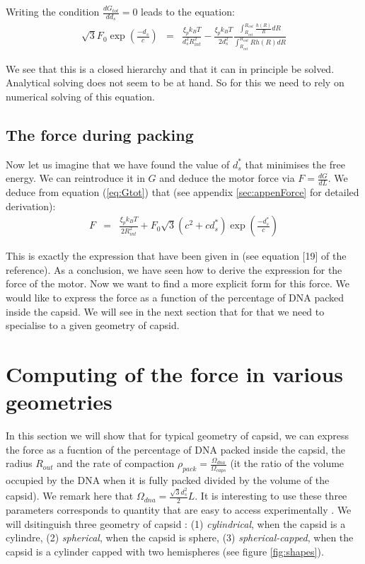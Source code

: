 \documentclass{article}
\begin{document}
Writing the condition $ \frac{d G_{tot}}{d d_s} = 0 $ leads to the equation:
\begin{eqnarray}
    \sqrt{3} F_0 \exp{ \left( \frac{-d_s}{c} \right) } &=& \frac{\xi_p k_B T}{d_s^2 R_{int}^2} - \frac{\xi_p k_B T}{2 d_s^2} \frac{\int_{R_{int}}^{R_{out}} \frac{h(R)}{R} dR}{\int_{R_{int}}^{R_{out}} R h(R) dR} 
    \label{eq:deriv_ds_final}
\end{eqnarray}

We see that this is a closed hierarchy and that it can in principle be solved. Analytical solving does not seem to be at hand. So for this we need to rely on numerical solving of this equation.

\subsection{The force during packing}
Now let us imagine that we have found the value of $d^*_s$ that minimises the free energy. We can reintroduce it in $G$ and deduce the motor force via $F=\frac{d G}{d L}$. We deduce from equation (\ref{eq:Gtot}) that (see appendix \ref{sec:appenForce} for detailed derivation):
\begin{eqnarray}
    F &=& \frac{\xi_p k_B T}{2 R_{int}^2} + F_0 \sqrt{3} \left( c^2 + c d_s^* \right) \exp{ \left( \frac{-d^*_s}{c} \right) }
    \label{eq:F}
\end{eqnarray}

This is exactly the expression that have been given in \cite{purohit2003} (see equation [19] of the reference).
As a conclusion, we have seen how to derive the expression for the force of the motor. Now we want to find a more explicit form for this force. We would like to express the force as a function of the percentage of DNA packed inside the capsid. We will see in the next section that for that we need to specialise to a given geometry of capsid.

\section{Computing of the force in various geometries}

In this section we will show that for typical geometry of capsid, we can express the force as a fucntion of the percentage of DNA packed inside the capsid, the radius $R_{out}$ and the rate of compaction $\rho_{pack} = \frac{\Omega_{dna}}{\Omega_{caps}}$ (it the ratio of the volume occupied by the DNA when it is fully packed divided by the volume of the capsid). We remark here that $ \Omega_{dna} = \frac{\sqrt{3}d_s^2}{2} L$. It is interesting to use these three parameters corresponds to quantity that are easy to access experimentally \cite{phillips2005, purohit2003}. We will dsitinguish three geometry of capsid : (1) \emph{cylindrical}, when the capsid is a cylindre, (2) \emph{spherical}, when the capsid is sphere, (3) \emph{spherical-capped}, when the capsid is a cylinder capped with two hemispheres (see figure \ref{fig:shapes}).
\end{document}
